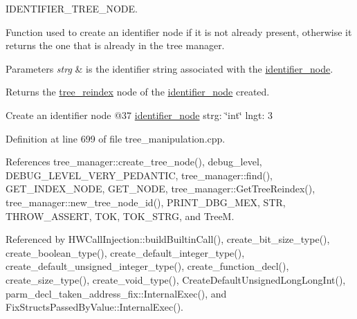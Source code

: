 I\+D\+E\+N\+T\+I\+F\+I\+E\+R\+\_\+\+T\+R\+E\+E\+\_\+\+N\+O\+DE. 

Function used to create an identifier node if it is not already present, otherwise it returns the one that is already in the tree manager. 
\begin{DoxyParams}{Parameters}
{\em strg} & is the identifier string associated with the \hyperlink{structidentifier__node}{identifier\+\_\+node}. \\
\hline
\end{DoxyParams}
\begin{DoxyReturn}{Returns}
the \hyperlink{classtree__reindex}{tree\+\_\+reindex} node of the \hyperlink{structidentifier__node}{identifier\+\_\+node} created.
\end{DoxyReturn}
Create an identifier node @37 \hyperlink{structidentifier__node}{identifier\+\_\+node} strg\+: \char`\"{}int\char`\"{} lngt\+: 3 

Definition at line 699 of file tree\+\_\+manipulation.\+cpp.



References tree\+\_\+manager\+::create\+\_\+tree\+\_\+node(), debug\+\_\+level, D\+E\+B\+U\+G\+\_\+\+L\+E\+V\+E\+L\+\_\+\+V\+E\+R\+Y\+\_\+\+P\+E\+D\+A\+N\+T\+IC, tree\+\_\+manager\+::find(), G\+E\+T\+\_\+\+I\+N\+D\+E\+X\+\_\+\+N\+O\+DE, G\+E\+T\+\_\+\+N\+O\+DE, tree\+\_\+manager\+::\+Get\+Tree\+Reindex(), tree\+\_\+manager\+::new\+\_\+tree\+\_\+node\+\_\+id(), P\+R\+I\+N\+T\+\_\+\+D\+B\+G\+\_\+\+M\+EX, S\+TR, T\+H\+R\+O\+W\+\_\+\+A\+S\+S\+E\+RT, T\+OK, T\+O\+K\+\_\+\+S\+T\+RG, and TreeM.



Referenced by H\+W\+Call\+Injection\+::build\+Builtin\+Call(), create\+\_\+bit\+\_\+size\+\_\+type(), create\+\_\+boolean\+\_\+type(), create\+\_\+default\+\_\+integer\+\_\+type(), create\+\_\+default\+\_\+unsigned\+\_\+integer\+\_\+type(), create\+\_\+function\+\_\+decl(), create\+\_\+size\+\_\+type(), create\+\_\+void\+\_\+type(), Create\+Default\+Unsigned\+Long\+Long\+Int(), parm\+\_\+decl\+\_\+taken\+\_\+address\+\_\+fix\+::\+Internal\+Exec(), and Fix\+Structs\+Passed\+By\+Value\+::\+Internal\+Exec().

